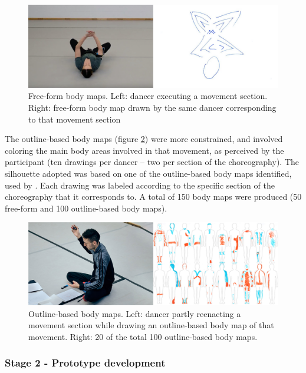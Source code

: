 \begin{figure}[ht]
  \centering
  \includegraphics[width=0.9\linewidth]{Chapters/Figures/modi_dis/Zjana.jpg}
  \caption{Free-form body maps. Left: dancer executing a movement section. Right: free-form body map drawn by the same dancer corresponding to that movement section}
    \label{fig:free-form-map}
\end{figure}

The outline-based body maps (figure \ref{fig:outline-based-map})  were more constrained, and involved coloring the main body areas involved in that movement, as perceived by the participant (ten drawings per dancer – two per section of the choreography). The silhouette adopted was based on one of the outline-based body maps identified, used by  \cite{nummenmaa_bodily_2014}. Each drawing was labeled according to the specific section of the choreography that it corresponds to. A total of 150 body maps were produced (50 free-form and 100 outline-based body maps).

\begin{figure}[ht]
  \centering
  \includegraphics[width=0.9\linewidth]{Chapters/Figures/modi_dis/Juan.jpg}
  \caption{Outline-based body maps. Left: dancer partly reenacting a movement section while drawing an outline-based body map of that movement. Right: 20 of the total 100 outline-based body maps.}
    \label{fig:outline-based-map}
\end{figure}

\subsubsection{Stage 2 - Prototype development}

